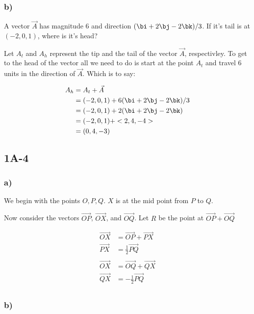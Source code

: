 \subsubsection*{b)}
    A vector $\vec{A}$ has magnitude 6 and 
    direction $(\bi + 2\bj - 2\bk)/3$. If it's tail is at $(-2, 0 , 1)$, 
    where is it's head?

    Let $A_t$ and $A_h$ represent the tip and the tail of the vector 
    $\vec{A}$, respectivley.
    To get to the head of the vector all we need to do is start at the
    point $A_t$ and travel 6 units in the direction of $\vec{A}$.
    Which is to say:

    \begin{align*}
    A_h &= A_t + \vec{A}\\
    &= (-2,0,1) + 6(\bi + 2\bj - 2\bk)/3\\
    &= (-2,0,1) + 2(\bi + 2\bj - 2\bk)\\
    &= (-2,0,1) + <2,4, -4>\\
    &= (0,4,-3)\\
    \end{align*}

\subsection*{1A-4}

\subsubsection*{a)}

We begin with the points $O, P, Q$. $X$ is at the mid point from $P$ 
to $Q$.

Now consider the vectors $\vec{OP}$, $\vec{OX}$, and $\vec{OQ}$.
Let $R$ be the point at $\vec{OP} + \vec{OQ}$

\begin{align*}
\vec{OX} &= \vec{OP} + \vec{PX} \\
\vec{PX} &= \frac{1}{2}\vec{PQ} \\
\\
\vec{OX} &= \vec{OQ} + \vec{QX}\\
\vec{QX} &= -\frac{1}{2}\vec{PQ} \\
\end{align*}


\subsubsection*{b)}

